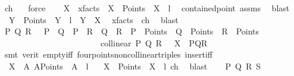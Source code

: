 \begin{isabellebody}
\ ch\ {}\ \isamarkupfalse%
\ force\isanewline
\ \ \isamarkupfalse%
\ X\ \ xfacts{\isacharcolon}{\kern0pt}\ {\isachardoublequoteopen}\ X\ {\isasymin}\ Points\ {\isasymand}\ X\ {\isasymlhd}\ l{\isachardoublequoteclose}\ \isamarkupfalse%
\ contained{\isacharunderscore}{\kern0pt}point\ assms\ \isamarkupfalse%
\ blast\isanewline
\ \ \isamarkupfalse%
\ {}{}{\isacharcolon}{\kern0pt}\ {\isachardoublequoteopen}{\isacharparenleft}{\kern0pt}Y\ {\isasymin}\ Points{\isacharparenright}{\kern0pt}\ {\isasymand}\ {\isacharparenleft}{\kern0pt}Y\ {\isasymlhd}\ l{\isacharparenright}{\kern0pt}\ {\isasymlongrightarrow}\ Y\ {\isacharequal}{\kern0pt}\ X{\isachardoublequoteclose}\ \isamarkupfalse%
\ xfacts\ {}\ ch\ \isamarkupfalse%
\ blast\isanewline
\ \ \isamarkupfalse%
\ P\ Q\ R\ \ \ {\isachardoublequoteopen}P\ {\isasymnoteq}\ Q\ {\isasymand}\ P\ {\isasymnoteq}\ R\ {\isasymand}\ Q\ {\isasymnoteq}\ R\ {\isasymand}\ P\ {\isasymin}\ Points\ {\isasymand}\ Q\ {\isasymin}\ Points\ {\isasymand}\ R\ {\isasymin}\ Points\isanewline
\ \ \ \ \ \ \ \ \ \ \ \ \ \ \ \ \ \ \ \ \ \ {\isasymand}\ {\isasymnot}\ collinear\ P\ Q\ R\ \ {\isasymand}\ X\ {\isasymnotin}\ {\isacharbraceleft}{\kern0pt}P{\isacharcomma}{\kern0pt}Q{\isacharcomma}{\kern0pt}R{\isacharbraceright}{\kern0pt}{\isachardoublequoteclose}\ \isanewline
\ \ \ \ \isamarkupfalse%
\ {\isacharparenleft}{\kern0pt}smt\ {\isacharparenleft}{\kern0pt}verit{\isacharparenright}{\kern0pt}\ empty{\isacharunderscore}{\kern0pt}iff\ four{\isacharunderscore}{\kern0pt}points{\isacharunderscore}{\kern0pt}noncollinear{\isacharunderscore}{\kern0pt}triples\ insert{\isacharunderscore}{\kern0pt}iff{\isacharparenright}{\kern0pt}\isanewline
\ \ \isamarkupfalse%
\ {}{\isacharcolon}{\kern0pt}\ {\isachardoublequoteopen}{\isacharbraceleft}{\kern0pt}X{\isacharbraceright}{\kern0pt}\ {\isacharequal}{\kern0pt}\ {\isacharbraceleft}{\kern0pt}A{\isachardot}{\kern0pt}\ A{\isasymin}Points\ {\isasymand}\ A\ {\isasymlhd}\ l{\isacharbraceright}{\kern0pt}{\isachardoublequoteclose}\ \isamarkupfalse%
\ {}\ {\isacartoucheopen}X\ {\isasymin}\ Points\ {\isasymand}\ X\ {\isasymlhd}\ l{\isacartoucheclose}\ ch\ \isamarkupfalse%
\ blast\isanewline
\isanewline
\ \ \isamarkupfalse%
\ P\ Q\ R\ S\ \ \isanewline

\end{isabellebody}

